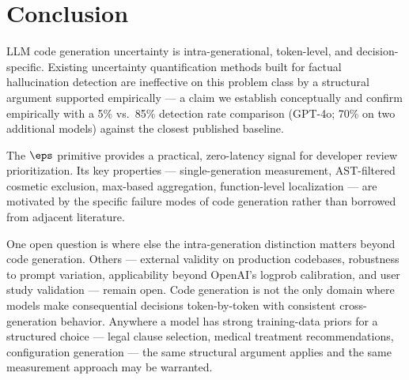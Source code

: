 \section{Conclusion}
\label{sec:conclusion}

LLM code generation uncertainty is intra-generational, token-level, and
decision-specific. Existing uncertainty quantification methods built for
factual hallucination detection are ineffective on this problem class by a
structural argument supported empirically --- a claim we establish
conceptually and confirm empirically with a 5\% vs.\ 85\% detection rate
comparison (GPT-4o; 70\% on two additional models) against the closest
published baseline.

The $\eps$ primitive provides a practical, zero-latency signal for developer
review prioritization. Its key properties --- single-generation measurement,
AST-filtered cosmetic exclusion, max-based aggregation, function-level
localization --- are motivated by the specific failure modes of code
generation rather than borrowed from adjacent literature.

One open question is where else the intra-generation distinction matters
beyond code generation. Others --- external validity on production
codebases, robustness to prompt variation, applicability beyond OpenAI's
logprob calibration, and user study validation --- remain open.
Code generation is not the only domain where models make consequential
decisions token-by-token with consistent cross-generation behavior. Anywhere
a model has strong training-data priors for a structured choice --- legal
clause selection, medical treatment recommendations, configuration
generation --- the same structural argument applies and the same measurement
approach may be warranted.
